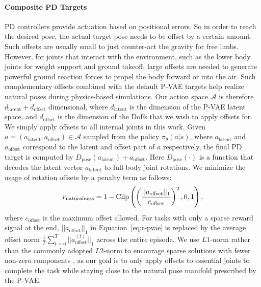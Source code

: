 \paragraph{Composite PD Targets}
PD controllers provide actuation based on positional errors. So in order to reach the desired pose, the actual target pose needs to be offset by a certain amount. Such offsets are usually small to just counter-act the gravity for free limbs. However, for joints that interact with the environment, such as the lower body joints for weight support and ground takeoff, large offsets are needed to generate powerful ground reaction forces to propel the body forward or into the air. Such complementary offsets combined with the default P-VAE targets help realize natural poses during physics-based simulations. Our action space $\mathcal{A}$ is therefore $d_{\text{latent}} + d_{\text{offset}}$ dimensional, where $d_{\text{latent}}$ is the dimension of the P-VAE latent space, and $d_{\text{offset}}$ is the dimension of the DoFs that we wish to apply offsets for. We simply apply offsets to all internal joints in this work. Given $a=(a_{\text{latent}},a_{\text{offset}}) \in \mathcal{A}$ sampled from the policy $\pi_\theta(a|s)$, where $a_{\text{latent}}$ and $a_{\text{offset}}$ correspond to the latent and offset part of $a$ respectively, the final PD target is computed by $D_{\text{pose}}(a_{\text{latent}}) + a_{\text{offset}}$. Here $D_{\text{pose}}(\cdot)$ is a function that decodes the latent vector $a_{\text{latent}}$ to full-body joint rotations. We minimize the usage of rotation offsets by a penalty term as follows:
\begin{equation}
\label{eq:r-pvae}
    r_{\text{naturalness}} = 1 - \mathop{\mathrm{Clip}}\nolimits\left(\left(\frac{||a_{\text{offset}}||_1}{c_{\text{offset}}}\right)^2, 0, 1\right) ,
\end{equation}
where $c_{\text{offset}}$ is the maximum offset allowed. For tasks with only a sparse reward signal at the end, $||a_{\text{offset}}||_1$ in Equation~\ref{eq:r-pvae} is replaced by the average offset norm $\frac{1}{T}\sum_{t=0}^T{||a^{(t)}_{\text{offset}}||_1}$ across the entire episode. We use $L1$-norm rather than the commonly adopted $L2$-norm to encourage sparse solutions with fewer non-zero components \cite{tibshirani1996regression, chen2001atomic}, as our goal is to only apply offsets to essential joints to complete the task while staying close to the natural pose manifold prescribed by the P-VAE.